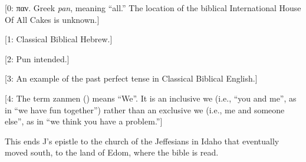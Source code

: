 \Sentence
{ \hX{} }
{ \eX{} }
{
    [0: παν. Greek \emph{pan}, meaning ``all.'' The location of the biblical International House Of All Cakes is unknown.]

    [1: Classical Biblical Hebrew.]

    [2: Pun intended.]

    [3: An example of the past perfect tense in Classical Biblical English.]

    [4: The term zanmen () means ``We''. It is an inclusive we (i.e., ``you and me'', as in ``we have fun together'') rather than an exclusive we (i.e., me and someone else'', as in ``we think you have a problem.'']
}

\Sentence
{ \hX{} }
{ \eX{} }
{
    This ends J's epistle to the church of the Jeffesians in Idaho that eventually moved south, to the land of Edom, where the bible is read.
}
